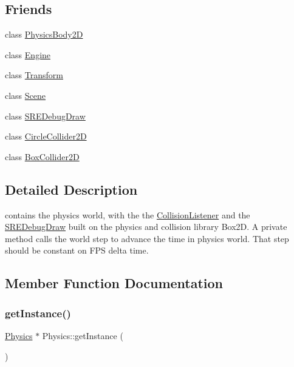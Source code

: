 \subsection*{Friends}
\begin{DoxyCompactItemize}
\item 
class \hyperlink{class_mason_1_1_physics_a60dcb177f208afef9864b04ec483a960}{Physics\+Body2D}
\item 
class \hyperlink{class_mason_1_1_physics_a3e1914489e4bed4f9f23cdeab34a43dc}{Engine}
\item 
class \hyperlink{class_mason_1_1_physics_af851b4d9aacd1a871da33592334b8d72}{Transform}
\item 
class \hyperlink{class_mason_1_1_physics_a032858ae1fe02d2d1170981c2af2d67c}{Scene}
\item 
class \hyperlink{class_mason_1_1_physics_ab15c5307c2a47823bec7f9c8deedcbd0}{S\+R\+E\+Debug\+Draw}
\item 
class \hyperlink{class_mason_1_1_physics_a55094363fa44c6fe8cccbd7213309403}{Circle\+Collider2D}
\item 
class \hyperlink{class_mason_1_1_physics_ae5e915b753caa5273de73badf505458f}{Box\+Collider2D}
\end{DoxyCompactItemize}


\subsection{Detailed Description}
contains the physics world, with the the \hyperlink{class_mason_1_1_collision_listener}{Collision\+Listener} and the \hyperlink{class_mason_1_1_s_r_e_debug_draw}{S\+R\+E\+Debug\+Draw} built on the physics and collision library Box2D. A private method calls the world step to advance the time in physics world. That step should be constant on F\+PS delta time. 

\subsection{Member Function Documentation}
\hypertarget{class_mason_1_1_physics_aba5aeb438d394e23ebd74bdc4aa716c2}{}\label{class_mason_1_1_physics_aba5aeb438d394e23ebd74bdc4aa716c2} 
\subsubsection{\texorpdfstring{get\+Instance()}{getInstance()}}
{\footnotesize\ttfamily \hyperlink{class_mason_1_1_physics}{Physics} $\ast$ Physics\+::get\+Instance (\begin{DoxyParamCaption}{ }\end{DoxyParamCaption})\hspace{0.3cm}{\ttfamily [static]}}

